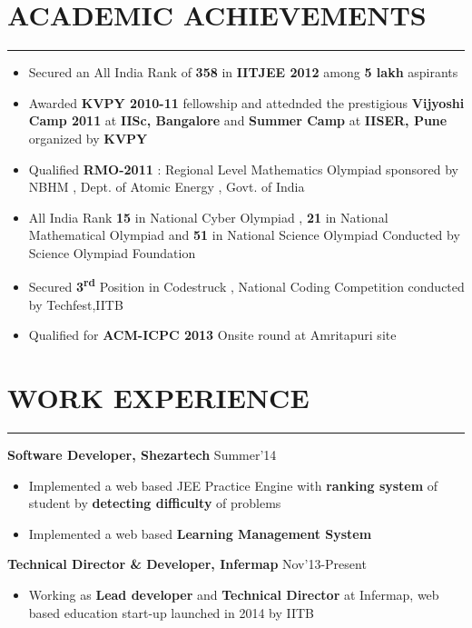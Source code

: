 \documentclass[11pt]{article} %
\begin{document}
\vspace*{25mm}
\section*{ACADEMIC ACHIEVEMENTS}
\hrule
\medskip
\begin{itemize}
\itemsep-0.3em
\item Secured an All India Rank of {\bf 358} in {\bf IITJEE 2012} among {\bf 5 lakh} aspirants
\item Awarded {\bf KVPY 2010-11} fellowship and  attednded the prestigious {\bf Vijyoshi Camp 2011} at {\bf IISc, Bangalore} and {\bf Summer 
Camp} at {\bf IISER, Pune} organized by {\bf KVPY}
\item Qualified {\bf RMO-2011} : Regional Level Mathematics Olympiad sponsored by NBHM , Dept. of Atomic Energy , Govt. of 
India
\item All India Rank {\bf 15} in National Cyber Olympiad , {\bf 21} in National Mathematical Olympiad and {\bf 51} in National Science 
Olympiad Conducted by Science Olympiad Foundation
\item Secured {\bf 3\textsuperscript{rd}} Position in Codestruck , National Coding Competition conducted by Techfest,IITB
\item Qualified for {\bf ACM-ICPC 2013} Onsite round at Amritapuri site
\end{itemize}
\vspace{-6mm}

\section*{WORK EXPERIENCE}
\hrule
\medskip

\noindent \textbf{Software Developer, Shezartech} \hfill Summer'14
\vspace{-3mm}
\begin{itemize}
\itemsep-0.3em
\item Implemented a web based JEE Practice Engine with {\bf ranking system} of student by {\bf detecting difficulty} of problems
\item Implemented a web based {\bf Learning Management System}
\end{itemize}
\vspace{-1mm}

\noindent \textbf{Technical Director \& Developer, Infermap} \hfill Nov'13-Present
\vspace{-3mm}
\begin{itemize}
\itemsep-0.3em
\item Working as {\bf Lead developer} and {\bf Technical Director} at Infermap, web based education start-up launched in 2014 by IITB
\end{itemize}
\vspace{-1mm}
\end{document}
